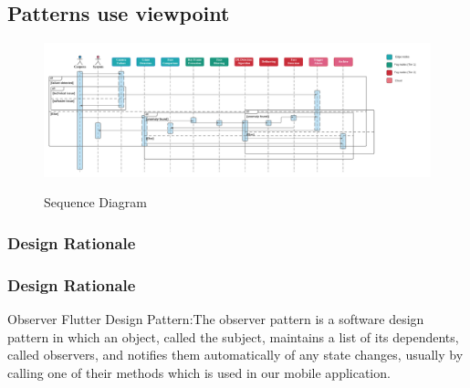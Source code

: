 \documentclass[12pt]{article}
\begin{document}
 \FloatBarrier
\subsection{Patterns use viewpoint}
\FloatBarrier
\begin{figure}[h]
  \centering
  \includegraphics[width=20cm]{sequence diagram.png}
  \label{fig:2}
   \caption{Sequence Diagram}
\end{figure}
\subsubsection{Design Rationale}
\subsubsection{Design Rationale}
 Observer Flutter Design Pattern:The observer pattern is a software design pattern in which an object, called the subject, maintains a list of its dependents, called observers, and notifies them automatically of any state changes, usually by calling one of their methods which is used in our mobile application.



\newpage
\end{document}
